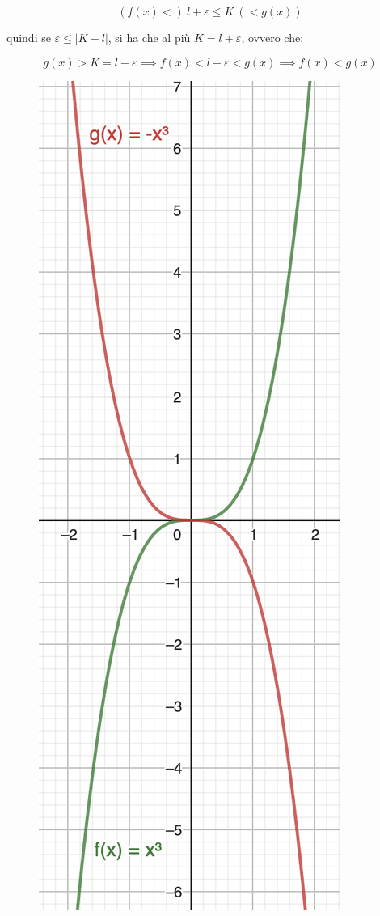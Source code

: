 \documentclass{article}
\begin{document}
\begin{equation*}
    (f(x) <)\ l + \varepsilon \leq K \ (< g(x))
\end{equation*}

\noindent quindi se $\varepsilon \leq |K - l|$, si ha che al più $K = l + \varepsilon$, ovvero che:

\begin{equation*}
    g(x) > K = l + \varepsilon \implies f(x) < l + \varepsilon < g(x) \implies f(x) < g(x)
\end{equation*}

\begin{figure}
\includegraphics[width=0.9\linewidth]{images/comparisonTheoremI.png} 
\end{figure}
\end{document}
